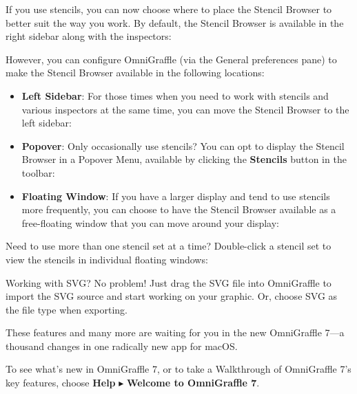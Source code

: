 \documentclass[../main.tex]{subfiles}
\begin{document}

If you use stencils, you can now choose where to place the Stencil Browser to better suit the
way you work. By default, the Stencil Browser is available in the right sidebar along with the
inspectors:


However, you can configure OmniGraffle (via the General preferences pane) to make the Stencil
Browser available in the following locations:

\begin{itemize}
  \item \textbf{Left Sidebar}: For those times when you need to work with stencils and various
    inspectors at the same time, you can move the Stencil Browser to the left sidebar:

  \item \textbf{Popover}: Only occasionally use stencils? You can opt to display the Stencil
    Browser in a Popover Menu, available by clicking the \textbf{Stencils} button in the
    toolbar:

  \item \textbf{Floating Window}: If you have a larger display and tend to use stencils more
    frequently, you can choose to have the Stencil Browser available as a free-floating window
    that you can move around your display:

\end{itemize}

Need to use more than one stencil set at a time? Double-click a stencil set to view the stencils
in individual floating windows:


Working with SVG? No problem! Just drag the SVG file into OmniGraffle to import the SVG source
and start working on your graphic. Or, choose SVG as the file type when exporting.


These features and many more are waiting for you in the new OmniGraffle 7---a thousand changes
in one radically new app for macOS.

\begin{ogtip}
  To see what's new in OmniGraffle 7, or to take a Walkthrough of OmniGraffle 7's key features,
  choose \textbf{Help} $\blacktriangleright$ \textbf{Welcome to OmniGraffle 7}.
\end{ogtip}
\end{document}
